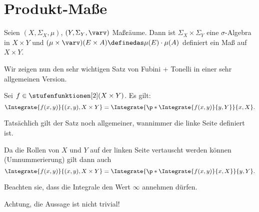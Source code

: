 \section{Produkt-Maße}
Seien \( (X,\Sigma_X,\mu) \), \( (Y,\Sigma_Y,\varv) \) Maßräume. Dann ist \( \Sigma_X \times \Sigma_Y \) eine \( \sigma \)-Algebra in \( X\times Y \) und \( (\mu\times \varv)(E\times A)\definedas \mu(E)\cdot \mu(A) \) definiert ein Maß auf \( X\times Y \).

Wir zeigen nun den sehr wichtigen Satz von Fubini + Tonelli in einer sehr allgemeinen Version.
\begin{satz}[Fubini]\label{fubini}
  Sei \( f\in \stufenfunktionen[2](X\times Y) \). Es gilt:
  \begin{equation*}
    \Integrate{f(x,y)}{{(x,y)},{X\times Y}}=\Integrate{\p*{\Integrate{f(x,y)}{y,Y}}}{x,X}.
  \end{equation*}
\end{satz}
\begin{bemerkung*}
  Tatsächlich gilt der Satz noch allgemeiner, wannimmer die linke Seite definiert ist.
\end{bemerkung*}
\begin{bemerkung*}
  Da die Rollen von \( X \) und \( Y \) auf der linken Seite vertauscht werden können (Umnummerierung) gilt dann auch
  \begin{equation*}
    \Integrate{f(x,y)}{{(x,y)},{X\times Y}}=\Integrate{\p*{\Integrate{f(x,y)}{x,X}}}{y,Y}.
  \end{equation*}
\end{bemerkung*}
\begin{bemerkung*}
  Beachten sie, dass die Integrale den Wert \( \infty \) annehmen dürfen.
\end{bemerkung*}
Achtung, die Aussage ist nicht trivial!
